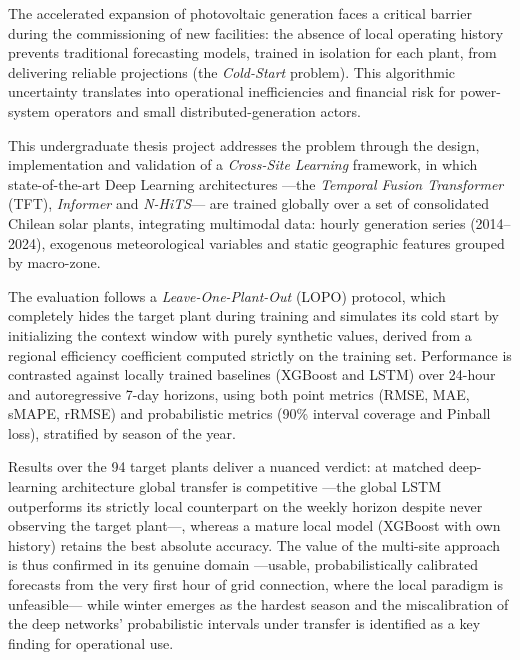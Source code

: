 The accelerated expansion of photovoltaic generation faces a critical barrier during the commissioning of new facilities: the absence of local operating history prevents traditional forecasting models, trained in isolation for each plant, from delivering reliable projections (the \textit{Cold-Start} problem). This algorithmic uncertainty translates into operational inefficiencies and financial risk for power-system operators and small distributed-generation actors.

This undergraduate thesis project addresses the problem through the design, implementation and validation of a \textit{Cross-Site Learning} framework, in which state-of-the-art Deep Learning architectures —the \textit{Temporal Fusion Transformer} (TFT), \textit{Informer} and \textit{N-HiTS}— are trained globally over a set of consolidated Chilean solar plants, integrating multimodal data: hourly generation series (2014--2024), exogenous meteorological variables and static geographic features grouped by macro-zone.

The evaluation follows a \textit{Leave-One-Plant-Out} (LOPO) protocol, which completely hides the target plant during training and simulates its cold start by initializing the context window with purely synthetic values, derived from a regional efficiency coefficient computed strictly on the training set. Performance is contrasted against locally trained baselines (XGBoost and LSTM) over 24-hour and autoregressive 7-day horizons, using both point metrics (RMSE, MAE, sMAPE, rRMSE) and probabilistic metrics (90\% interval coverage and Pinball loss), stratified by season of the year.

Results over the 94 target plants deliver a nuanced verdict: at matched deep-learning architecture global transfer is competitive —the global LSTM outperforms its strictly local counterpart on the weekly horizon despite never observing the target plant—, whereas a mature local model (XGBoost with own history) retains the best absolute accuracy. The value of the multi-site approach is thus confirmed in its genuine domain —usable, probabilistically calibrated forecasts from the very first hour of grid connection, where the local paradigm is unfeasible— while winter emerges as the hardest season and the miscalibration of the deep networks' probabilistic intervals under transfer is identified as a key finding for operational use.
